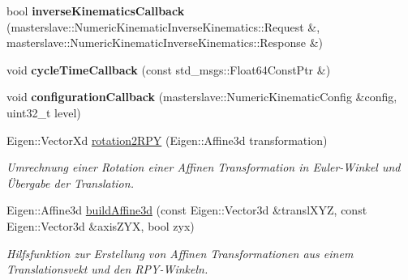 \begin{DoxyCompactItemize}
\item 
\hypertarget{classNumericKinematic_a703b5b58b9edb0039f296e64f8b6e3ab}{bool {\bfseries inverse\-Kinematics\-Callback} (masterslave\-::\-Numeric\-Kinematic\-Inverse\-Kinematics\-::\-Request \&, masterslave\-::\-Numeric\-Kinematic\-Inverse\-Kinematics\-::\-Response \&)}\label{classNumericKinematic_a703b5b58b9edb0039f296e64f8b6e3ab}

\item 
\hypertarget{classNumericKinematic_a6d621216d4e3779465caf121ed931710}{void {\bfseries cycle\-Time\-Callback} (const std\-\_\-msgs\-::\-Float64\-Const\-Ptr \&)}\label{classNumericKinematic_a6d621216d4e3779465caf121ed931710}

\item 
\hypertarget{classNumericKinematic_a51d9888088eec181ecc3846006348ce7}{void {\bfseries configuration\-Callback} (masterslave\-::\-Numeric\-Kinematic\-Config \&config, uint32\-\_\-t level)}\label{classNumericKinematic_a51d9888088eec181ecc3846006348ce7}

\item 
Eigen\-::\-Vector\-Xd \hyperlink{classNumericKinematic_a4486d237a9ec27b6f092ffedf379e02c}{rotation2\-R\-P\-Y} (Eigen\-::\-Affine3d transformation)
\begin{DoxyCompactList}\small\item\em Umrechnung einer Rotation einer Affinen Transformation in Euler-\/\-Winkel und Übergabe der Translation. \end{DoxyCompactList}\item 
Eigen\-::\-Affine3d \hyperlink{classNumericKinematic_a6f116ab38ed9ff1aa0e90b710a4898f8}{build\-Affine3d} (const Eigen\-::\-Vector3d \&transl\-X\-Y\-Z, const Eigen\-::\-Vector3d \&axis\-Z\-Y\-X, bool zyx)
\begin{DoxyCompactList}\small\item\em Hilfsfunktion zur Erstellung von Affinen Transformationen aus einem Translationsvekt und den R\-P\-Y-\/\-Winkeln. \end{DoxyCompactList}\end{DoxyCompactItemize}
